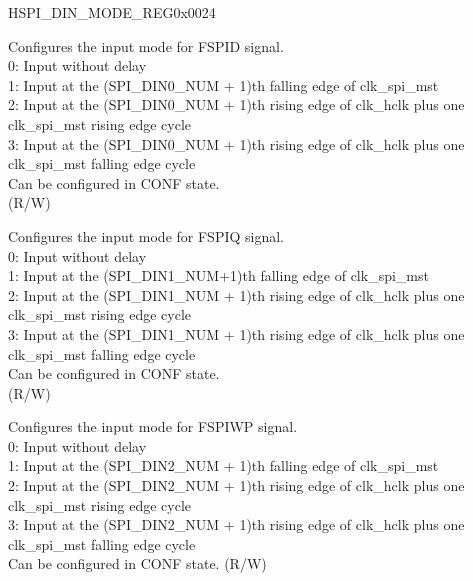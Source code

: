 \begin{register}{H}{SPI\_DIN\_MODE\_REG}{0x0024}\label{regdesc:SPIDINMODEREG}
%
%
%
%
%
%
%
%
%
%
\regnewline%
\begin{regdesc}\begin{reglist}
\label{fielddesc:SPIDIN0MODE}\item [SPI\_DIN0\_MODE] Configures the input mode for FSPID signal.\\
0: Input without delay\\
1: Input at the (SPI\_DIN0\_NUM + 1)th falling edge of clk\_spi\_mst\\
2: Input at the (SPI\_DIN0\_NUM + 1)th rising edge of clk\_hclk plus one clk\_spi\_mst rising edge cycle\\
3: Input at the (SPI\_DIN0\_NUM + 1)th rising edge of clk\_hclk plus one clk\_spi\_mst falling edge cycle\\
Can be configured in CONF state.\\ (R/W)
\label{fielddesc:SPIDIN1MODE}\item [SPI\_DIN1\_MODE] Configures the input mode for FSPIQ signal.\\
0: Input without delay\\
1: Input at the (SPI\_DIN1\_NUM+1)th falling edge of clk\_spi\_mst\\
2: Input at the (SPI\_DIN1\_NUM + 1)th rising edge of clk\_hclk plus one clk\_spi\_mst rising edge cycle\\
3: Input at the (SPI\_DIN1\_NUM + 1)th rising edge of clk\_hclk plus one clk\_spi\_mst falling edge cycle\\
    Can be configured in CONF state.\\ (R/W)
\label{fielddesc:SPIDIN2MODE}\item [SPI\_DIN2\_MODE] Configures the input mode for FSPIWP signal.\\
0: Input without delay\\
1: Input at the (SPI\_DIN2\_NUM + 1)th falling edge of clk\_spi\_mst\\
2: Input at the (SPI\_DIN2\_NUM + 1)th rising edge of clk\_hclk plus one clk\_spi\_mst rising edge cycle\\
3: Input at the (SPI\_DIN2\_NUM + 1)th rising edge of clk\_hclk plus one clk\_spi\_mst falling edge cycle\\
Can be configured in CONF state. (R/W)


\end{reglist}
\end{regdesc}
\end{register}
